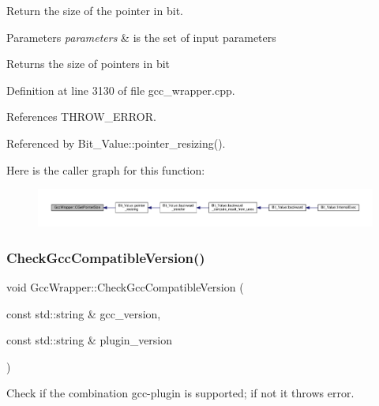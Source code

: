 Return the size of the pointer in bit. 


\begin{DoxyParams}{Parameters}
{\em parameters} & is the set of input parameters \\
\hline
\end{DoxyParams}
\begin{DoxyReturn}{Returns}
the size of pointers in bit 
\end{DoxyReturn}


Definition at line 3130 of file gcc\+\_\+wrapper.\+cpp.



References T\+H\+R\+O\+W\+\_\+\+E\+R\+R\+OR.



Referenced by Bit\+\_\+\+Value\+::pointer\+\_\+resizing().

Here is the caller graph for this function\+:
\nopagebreak
\begin{figure}[H]
\begin{center}
\leavevmode
\includegraphics[width=350pt]{d4/dbf/classGccWrapper_abc1a0fb1d8c8bd5d9cac9ac120a8f2b2_icgraph}
\end{center}
\end{figure}
\mbox{\label{classGccWrapper_ac7ff70c47c923a35ae9820b32b2e9e44}} 
\subsubsection{\texorpdfstring{Check\+Gcc\+Compatible\+Version()}{CheckGccCompatibleVersion()}}
{\footnotesize\ttfamily void Gcc\+Wrapper\+::\+Check\+Gcc\+Compatible\+Version (\begin{DoxyParamCaption}\item[{const std\+::string \&}]{gcc\+\_\+version,  }\item[{const std\+::string \&}]{plugin\+\_\+version }\end{DoxyParamCaption})\hspace{0.3cm}{\ttfamily [static]}}



Check if the combination gcc-\/plugin is supported; if not it throws error. 


